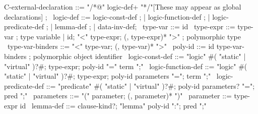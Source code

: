 \begin{syntax}
  C-external-declaration ::= "/*@" logic-def+ "*/"[These may appear as global  declarations] ;
  \
  logic-def ::= logic-const-def ;
          | logic-function-def ;
          | logic-predicate-def ;
          | lemma-def ;
          | data-inv-def;
  \
  type-var ::= id
  \
  type-expr ::= type-var ; type variable
  | id;
    "<" type-expr;
    (, type-expr)* ">" ; polymorphic type
  \
  type-var-binders ::= "<" type-var;
                       (, type-var)* ">"
  \
  poly-id ::= id type-var-binders ; polymorphic object identifier
  \
  logic-const-def ::= "logic" \ifCPPnc#( "static" | "virtual" )?#;
  type-expr;
  poly-id "=" term ";"
  \
  logic-function-def ::= "logic" \ifCPPnc#( "static" | "virtual" )?#;
  type-expr;
  poly-id parameters "=";
  term ";"
  \
  logic-predicate-def ::=
  "predicate" \ifCPPnc#( "static" | "virtual" )?#;
  poly-id parameters? "=";
  pred ";"
  \
  parameters ::= "(" parameter;
                 (, parameter)* ")"
  \
  parameter ::= type-expr id
  \
  lemma-def ::= clause-kind?;
                "lemma" poly-id ":";
                   pred ";"
\end{syntax}
